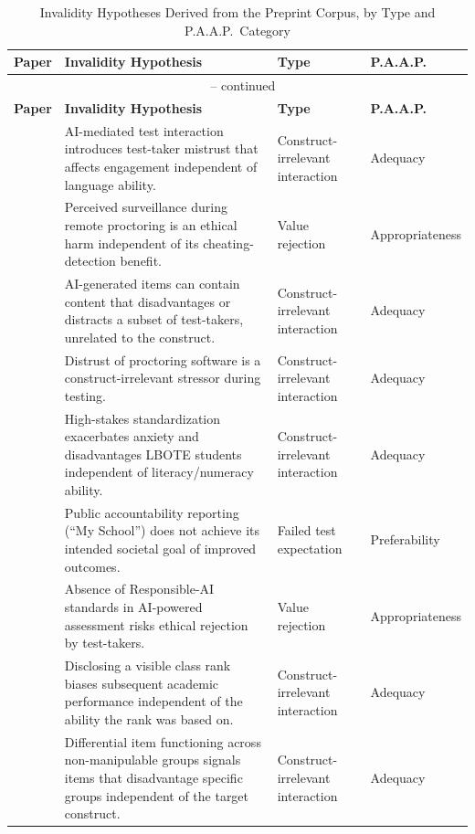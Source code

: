 \documentclass[11pt]{article}
\begin{document}
{\small
\begin{longtable}{p{2.6cm} p{8.6cm} p{2.6cm} p{1.7cm}}
\caption{Invalidity Hypotheses Derived from the Preprint Corpus, by Type and P.A.A.P.\ Category} \label{tab:invalidity} \\
\toprule
\textbf{Paper} & \textbf{Invalidity Hypothesis} & \textbf{Type} & \textbf{P.A.A.P.} \\
\midrule
\endfirsthead
\multicolumn{4}{c}{\tablename\ \thetable{} -- continued} \\
\toprule
\textbf{Paper} & \textbf{Invalidity Hypothesis} & \textbf{Type} & \textbf{P.A.A.P.} \\
\midrule
\endhead
\bottomrule
\endfoot
\citet{zhang2023testtakers} & AI-mediated test interaction introduces test-taker mistrust that affects engagement independent of language ability. & Construct-irrelevant interaction & Adequacy \\
\citet{mukherjee2024proctoring} & Perceived surveillance during remote proctoring is an ethical harm independent of its cheating-detection benefit. & Value rejection & Appropriateness \\
\citet{stowe2024fairness} & AI-generated items can contain content that disadvantages or distracts a subset of test-takers, unrelated to the construct. & Construct-irrelevant interaction & Adequacy \\
\citet{balash2021examiners} & Distrust of proctoring software is a construct-irrelevant stressor during testing. & Construct-irrelevant interaction & Adequacy \\
\citet{zhangw2024naplan} & High-stakes standardization exacerbates anxiety and disadvantages LBOTE students independent of literacy/numeracy ability. & Construct-irrelevant interaction & Adequacy \\
\citet{zhangw2024naplan} & Public accountability reporting (``My School'') does not achieve its intended societal goal of improved outcomes. & Failed test expectation & Preferability \\
\citet{burstein2024responsible} & Absence of Responsible-AI standards in AI-powered assessment risks ethical rejection by test-takers. & Value rejection & Appropriateness \\
\citet{ladant2023saliency} & Disclosing a visible class rank biases subsequent academic performance independent of the ability the rank was based on. & Construct-irrelevant interaction & Adequacy \\
\citet{suk2026unfairness} & Differential item functioning across non-manipulable groups signals items that disadvantage specific groups independent of the target construct. & Construct-irrelevant interaction & Adequacy \\

\end{longtable}}
\end{document}
